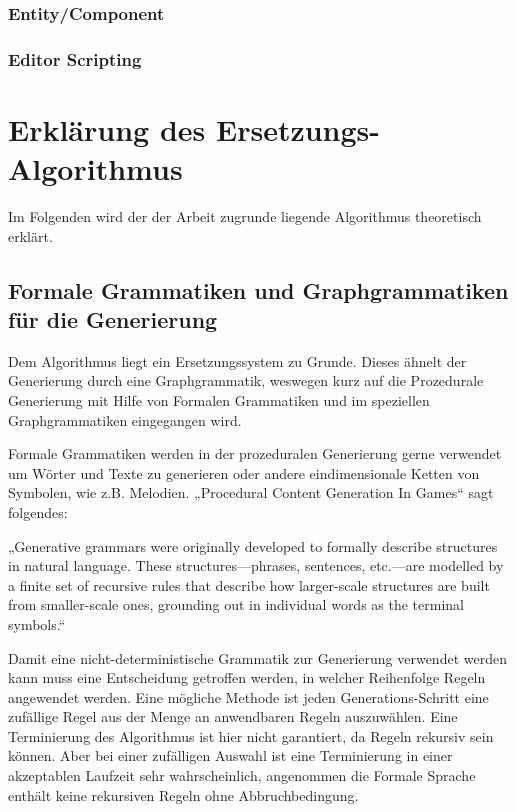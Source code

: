 \subsection{Entity/Component}

\subsection{Editor Scripting}


\chapter{Erklärung des Ersetzungs-Algorithmus}

Im Folgenden wird der der Arbeit zugrunde liegende Algorithmus theoretisch erklärt.

\section{Formale Grammatiken und Graphgrammatiken für die Generierung}

Dem Algorithmus liegt ein Ersetzungssystem zu Grunde. Dieses ähnelt der Generierung durch eine Graphgrammatik, weswegen kurz auf die Prozedurale Generierung mit Hilfe von Formalen Grammatiken und im speziellen Graphgrammatiken eingegangen wird.

Formale Grammatiken werden in der prozeduralen Generierung gerne verwendet um Wörter und Texte zu generieren oder andere eindimensionale Ketten von Symbolen, wie z.B. Melodien. „Procedural Content Generation In Games“ sagt folgendes:

„Generative grammars were originally developed to formally describe structures in natural language. These structures—phrases, sentences, etc.—are modelled by a finite set of recursive rules that describe how larger-scale structures are built from smaller-scale ones, grounding out in individual words as the terminal symbols.“
\cite[Kap.~3.5, S.~45]{shaker2016procedural}

Damit eine nicht-deterministische Grammatik zur Generierung verwendet werden kann muss eine Entscheidung getroffen werden, in welcher Reihenfolge Regeln angewendet werden. Eine mögliche Methode ist jeden Generations-Schritt eine zufällige Regel aus der Menge an anwendbaren Regeln auszuwählen. 
\cite[Kap.~5.2, S.~75]{shaker2016procedural}
Eine Terminierung des Algorithmus ist hier nicht garantiert, da Regeln rekursiv sein können. Aber bei einer zufälligen Auswahl ist eine Terminierung in einer akzeptablen Laufzeit sehr wahrscheinlich, angenommen die Formale Sprache enthält keine rekursiven Regeln ohne Abbruchbedingung. 

